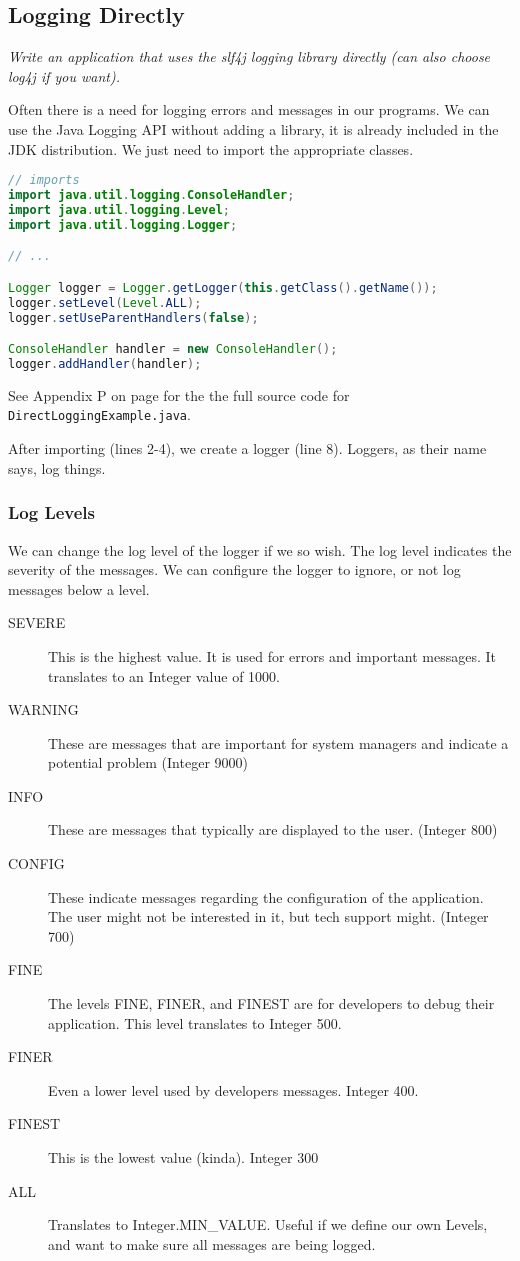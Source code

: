 \subsection{Logging Directly}
\textit{Write an application that uses the slf4j logging library directly (can also choose log4j if you want).}

Often there is a need for logging errors and messages in our programs. We can use the Java Logging API without adding a library, it is already included in the JDK distribution. We just need to import the appropriate classes.
\begin{lstlisting}[language=Java, label=lst:javaloggerlst]
// imports
import java.util.logging.ConsoleHandler;
import java.util.logging.Level;
import java.util.logging.Logger;

// ...

Logger logger = Logger.getLogger(this.getClass().getName());
logger.setLevel(Level.ALL);
logger.setUseParentHandlers(false);

ConsoleHandler handler = new ConsoleHandler();
logger.addHandler(handler);
\end{lstlisting}

See Appendix P on page \pageref{App:AppendixP} for the the full source code for \texttt{DirectLoggingExample.java}.

After importing (lines 2-4), we create a logger (line 8). Loggers, as their name says, log things. 

\subsubsection{Log Levels}
We can change the log level of the logger if we so wish. The log level indicates the severity of the messages. We can configure the logger to ignore, or not log messages below a level.
\begin{description}
\item[SEVERE] This is the highest value. It is used for errors and important messages. It translates to an Integer value of 1000.
\item[WARNING] These are messages that are important for system managers and indicate a potential problem (Integer 9000)
\item[INFO] These are messages that typically are displayed to the user. (Integer 800)
\item[CONFIG] These indicate messages regarding the configuration of the application. The user might not be interested in it, but tech support might. (Integer 700)
\item[FINE] The levels FINE, FINER, and FINEST are for developers to debug their application. This level translates to Integer 500.
\item[FINER] Even a lower level used by developers messages. Integer 400.
\item[FINEST] This is the lowest value (kinda). Integer 300
\item[ALL] Translates to Integer.MIN\_VALUE. Useful if we define our own Levels, and want to make sure all messages are being logged.
\end{description}

